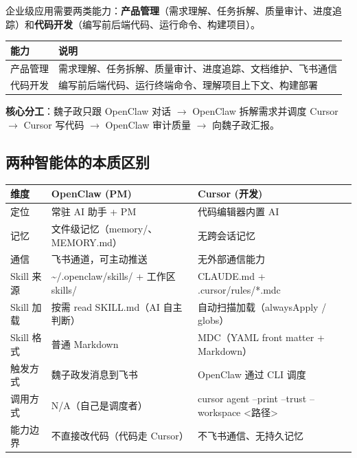 \documentclass[11pt,a4paper]{article}
\begin{document}
企业级应用需要两类能力：\textbf{产品管理}（需求理解、任务拆解、质量审计、进度追踪）和\textbf{代码开发}（编写前后端代码、运行命令、构建项目）。

\begin{table}[h]
\centering
\begin{tabularx}{\linewidth}{lX}
\toprule
\textbf{能力} & \textbf{说明} \\
\midrule
产品管理 & 需求理解、任务拆解、质量审计、进度追踪、文档维护、飞书通信 \\
代码开发 & 编写前后端代码、运行终端命令、理解项目上下文、构建部署 \\
\bottomrule
\end{tabularx}
\end{table}

\textbf{核心分工}：魏子政只跟 OpenClaw 对话 $\to$ OpenClaw 拆解需求并调度 Cursor $\to$ Cursor 写代码 $\to$ OpenClaw 审计质量 $\to$ 向魏子政汇报。

\subsection{两种智能体的本质区别}

\begin{table}[h]
\centering
\begin{tabularx}{\linewidth}{llX}
\toprule
\textbf{维度} & \textbf{OpenClaw (PM)} & \textbf{Cursor (开发)} \\
\midrule
定位 & 常驻 AI 助手 + PM & 代码编辑器内置 AI \\
记忆 & 文件级记忆（memory/、MEMORY.md） & 无跨会话记忆 \\
通信 & 飞书通道，可主动推送 & 无外部通信能力 \\
 Skill 来源 & \textasciitilde/.openclaw/skills/ + 工作区 skills/ & CLAUDE.md + .cursor/rules/*.mdc \\
Skill 加载 & 按需 read SKILL.md（AI 自主判断） & 自动扫描加载（alwaysApply / globs） \\
Skill 格式 & 普通 Markdown & MDC（YAML front matter + Markdown） \\
触发方式 & 魏子政发消息到飞书 & OpenClaw 通过 CLI 调度 \\
调用方式 & N/A（自己是调度者） & cursor agent --print --trust --workspace <路径> \\
能力边界 & 不直接改代码（代码走 Cursor） & 不飞书通信、无持久记忆 \\
\bottomrule
\end{tabularx}
\end{table}
\end{document}
